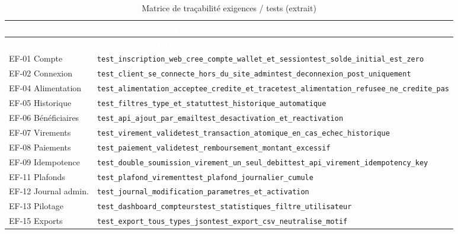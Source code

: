 \documentclass[11pt,a4paper]{report}
\newcommand{\entete}{\rowcolor{primaire}}
\newcommand{\tete}[1]{\textcolor{white}{\textbf{#1}}}
\newcommand{\code}[1]{\texttt{\small #1}}
\begin{document}
\begin{longtable}{@{}p{3.8cm}p{10.2cm}@{}}
\caption{Matrice de traçabilité exigences / tests (extrait)}\\
\toprule
\entete \tete{Exigence} & \tete{Tests représentatifs} \\
\midrule
\endfirsthead
\toprule
\entete \tete{Exigence} & \tete{Tests représentatifs} \\
\midrule
\endhead
EF-01 Compte & \code{test\_inscription\_web\_cree\_compte\_wallet\_et\_session}\newline \code{test\_solde\_initial\_est\_zero} \\
EF-02 Connexion & \code{test\_client\_se\_connecte\_hors\_du\_site\_admin}\newline \code{test\_deconnexion\_post\_uniquement} \\
EF-04 Alimentation & \code{test\_alimentation\_acceptee\_credite\_et\_trace}\newline \code{test\_alimentation\_refusee\_ne\_credite\_pas} \\
EF-05 Historique & \code{test\_filtres\_type\_et\_statut}\newline \code{test\_historique\_automatique} \\
EF-06 Bénéficiaires & \code{test\_api\_ajout\_par\_email}\newline \code{test\_desactivation\_et\_reactivation} \\
EF-07 Virements & \code{test\_virement\_valide}\newline \code{test\_transaction\_atomique\_en\_cas\_echec\_historique} \\
EF-08 Paiements & \code{test\_paiement\_valide}\newline \code{test\_remboursement\_montant\_excessif} \\
EF-09 Idempotence & \code{test\_double\_soumission\_virement\_un\_seul\_debit}\newline \code{test\_api\_virement\_idempotency\_key} \\
EF-11 Plafonds & \code{test\_plafond\_virement}\newline \code{test\_plafond\_journalier\_cumule} \\
EF-12 Journal admin. & \code{test\_journal\_modification\_parametres\_et\_activation} \\
EF-13 Pilotage & \code{test\_dashboard\_compteurs}\newline \code{test\_statistiques\_filtre\_utilisateur} \\
EF-15 Exports & \code{test\_export\_tous\_types\_json}\newline \code{test\_export\_csv\_neutralise\_motif} \\

\end{longtable}
\end{document}
